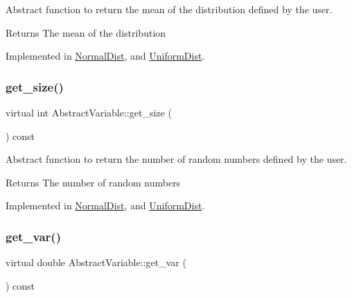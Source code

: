 Abstract function to return the mean of the distribution defined by the user. 

\begin{DoxyReturn}{Returns}
The mean of the distribution 
\end{DoxyReturn}


Implemented in \hyperlink{classNormalDist_a947707f47873251fd7857b4a7ed977bc}{Normal\+Dist}, and \hyperlink{classUniformDist_a18371ef0295e7aca4085015c0d844b41}{Uniform\+Dist}.

\mbox{\label{classAbstractVariable_a96d9b63c3d9aff4673a9c66738302766}} 
\subsubsection{\texorpdfstring{get\+\_\+size()}{get\_size()}}
{\footnotesize\ttfamily virtual int Abstract\+Variable\+::get\+\_\+size (\begin{DoxyParamCaption}{ }\end{DoxyParamCaption}) const\hspace{0.3cm}{\ttfamily [pure virtual]}}



Abstract function to return the number of random numbers defined by the user. 

\begin{DoxyReturn}{Returns}
The number of random numbers 
\end{DoxyReturn}


Implemented in \hyperlink{classNormalDist_a6dcfba2a8149dbd527392c32b3d7a7a1}{Normal\+Dist}, and \hyperlink{classUniformDist_a6e7a871053b2eb563fcbf2f7e02fb22b}{Uniform\+Dist}.

\mbox{\label{classAbstractVariable_a71d378332b0e5b3c1760bb98db5d906b}} 
\subsubsection{\texorpdfstring{get\+\_\+var()}{get\_var()}}
{\footnotesize\ttfamily virtual double Abstract\+Variable\+::get\+\_\+var (\begin{DoxyParamCaption}{ }\end{DoxyParamCaption}) const\hspace{0.3cm}{\ttfamily [pure virtual]}}



